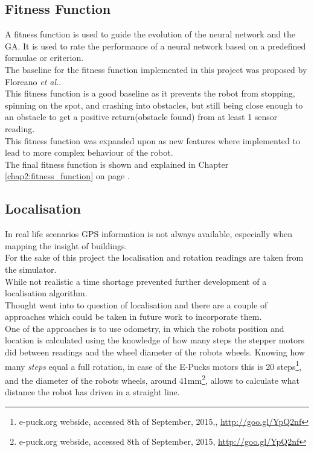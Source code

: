 \subsection{Fitness Function}
A fitness function is used to guide the evolution of the neural network and the GA. It is used to rate the performance of a neural network based on a predefined formulae or criterion.\\
The baseline for the fitness function implemented in this project was proposed by Floreano \textit{et al.}\cite{499791}. \\
This fitness function is a good baseline as it prevents the robot from stopping, spinning on the spot, and crashing into obstacles, but still being close enough to an obstacle to get a positive return(obstacle found) from at least 1 sensor reading. \\
This fitness function was expanded upon as new features where implemented to lead to more complex behaviour of the robot.\\
The final fitness function is shown and explained in Chapter \ref{chap2:fitness_function} on page \pageref{chap2:fitness_function}.

\subsection{Localisation}
In real life scenarios GPS information is not always available, especially when mapping the insight of buildings. \\
For the sake of this project the localisation and rotation readings are taken from the simulator. \\

While not realistic a time shortage prevented further development of a localisation algorithm.\\
Thought went into to question of localisation and there are a couple of approaches which could be taken in future work to incorporate them. \\
One of the approaches is to use odometry, in which the robots position and location is calculated using the knowledge of how many steps the stepper motors did between readings and the wheel diameter of the robots wheels. Knowing how many \textit{steps} equal a full rotation, in case of the E-Pucks motors this is 20 steps\footnote{e-puck.org webside, accessed 8th of September, 2015,, \url{http://goo.gl/YpQ2nf}}, and the diameter of the robots wheels, around 41mm\footnote{e-puck.org webside, accessed 8th of September, 2015, \url{http://goo.gl/YpQ2nf}}, allows to calculate what distance the robot has driven in a straight line. \\

